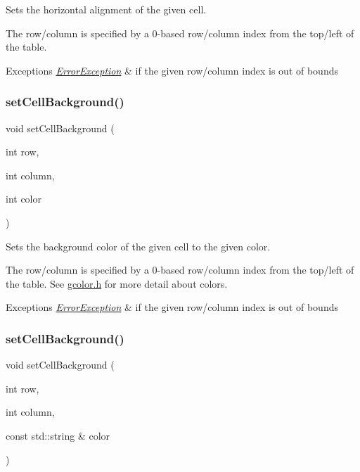 Sets the horizontal alignment of the given cell. 

The row/column is specified by a 0-\/based row/column index from the top/left of the table. 
\begin{DoxyExceptions}{Exceptions}
{\em \mbox{\hyperlink{classErrorException}{Error\+Exception}}} & if the given row/column index is out of bounds \\
\hline
\end{DoxyExceptions}
\mbox{\label{classGTable_a50940b22e500a861451bbff938c8f50b}} 
\subsubsection{\texorpdfstring{set\+Cell\+Background()}{setCellBackground()}\hspace{0.1cm}{\footnotesize\ttfamily [1/2]}}
{\footnotesize\ttfamily void set\+Cell\+Background (\begin{DoxyParamCaption}\item[{int}]{row,  }\item[{int}]{column,  }\item[{int}]{color }\end{DoxyParamCaption})\hspace{0.3cm}{\ttfamily [virtual]}}



Sets the background color of the given cell to the given color. 

The row/column is specified by a 0-\/based row/column index from the top/left of the table. See \mbox{\hyperlink{gcolor_8h_source}{gcolor.\+h}} for more detail about colors. 
\begin{DoxyExceptions}{Exceptions}
{\em \mbox{\hyperlink{classErrorException}{Error\+Exception}}} & if the given row/column index is out of bounds \\
\hline
\end{DoxyExceptions}
\mbox{\label{classGTable_af2d2fa204d2f9260081102a990310cd7}} 
\subsubsection{\texorpdfstring{set\+Cell\+Background()}{setCellBackground()}\hspace{0.1cm}{\footnotesize\ttfamily [2/2]}}
{\footnotesize\ttfamily void set\+Cell\+Background (\begin{DoxyParamCaption}\item[{int}]{row,  }\item[{int}]{column,  }\item[{const std\+::string \&}]{color }\end{DoxyParamCaption})\hspace{0.3cm}{\ttfamily [virtual]}}



